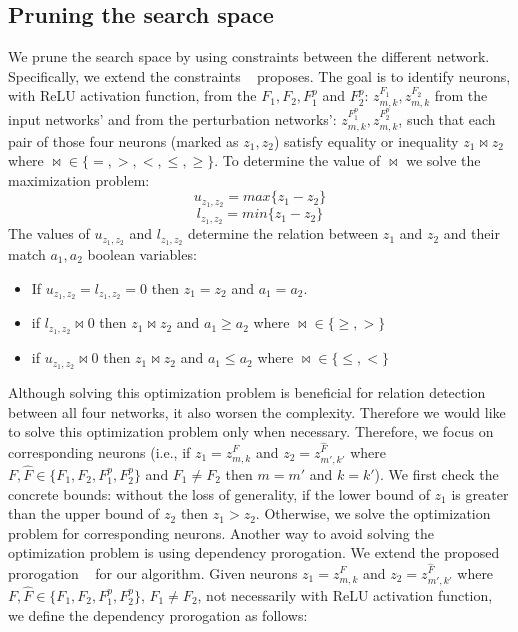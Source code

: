 \subsection{Pruning the search space}\label{PRUNESUBSECTION}
We prune the search space by using constraints between the different network. Specifically, we extend the constraints ~\cite{VHAGAR} proposes. The goal is to identify neurons, with ReLU activation function, from the $F_1, F_2, F^p_1$ and $F^p_2$: 
$z^{F_1}_{m,k},z^{F_2}_{m,k}$ from the input networks' and from the perturbation networks': $z^{F^p_1}_{m,k}, z^{F^p_2}_{m,k}$, such that each pair of those four neurons (marked as $z_1,z_2$) satisfy equality or inequality $z_1\bowtie z_2$ where $\bowtie\in{\{=,>,<,\le,\ge\}}$. To determine the value of $\bowtie$ we solve the maximization problem:
$$ u_{z_1,z_2}=max{\{z_1-z_2\}} $$
$$ l_{z_1,z_2}=min{\{z_1-z_2\}} $$
The values of $u_{z_1,z_2}$ and $l_{z_1,z_2}$ determine the relation between $z_1$ and $z_2$ and their match $a_1,a_2$ boolean variables:
\begin{itemize}
    \item If $u_{z_1,z_2}=l_{z_1,z_2}=0$ then $z_1=z_2$ and $a_1=a_2$.
    \item if $l_{z_1,z_2}\bowtie{0}$ then $z_1\bowtie{z_2}$ and $a_1\ge{a_2}$ where $\bowtie\in{\{\ge,>\}}$
    \item if $u_{z_1,z_2}\bowtie{0}$ then $z_1\bowtie{z_2}$ and $a_1\le{a_2}$ where $\bowtie\in{\{\le,<\}}$
\end{itemize}
Although solving this optimization problem is beneficial for relation detection between all four networks, it also worsen the complexity. Therefore we would like to solve this optimization problem only when necessary. Therefore, we focus on corresponding neurons (i.e., if $z_1=z^F_{m,k}$ and $z_2=z^{\hat{F}}_{m',k'}$ where $F,\hat{F}\in{\{F_1,F_2,F^p_1,F^p_2\}}$ and $F_1\neq{F_2}$ then $m=m'$ and $k=k'$). We first check the concrete bounds: without the loss of generality, if the lower bound of $z_1$ is greater than the upper bound of $z_2$ then $z_1>z_2$. Otherwise, we solve the optimization problem for corresponding neurons. Another way to avoid solving the optimization problem is using dependency prorogation. We extend the proposed prorogation ~\cite{VHAGAR} for our algorithm. Given neurons $z_1=z^F_{m,k}$ and $z_2=z^{\hat{F}}_{m',k'}$ where $F,\hat{F}\in{\{F_1,F_2,F^p_1,F^p_2\}}$, $F_1\neq{F_2}$, not necessarily with ReLU activation function, we define the dependency prorogation as follows:

